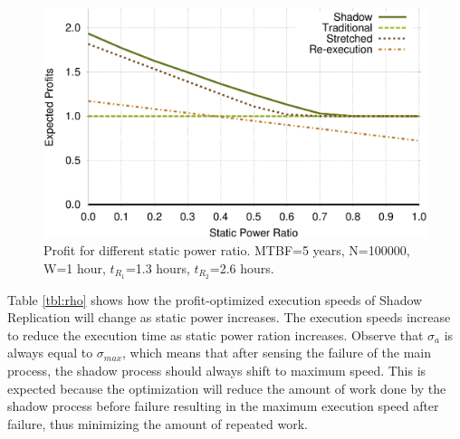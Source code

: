 \begin{figure}[!h]	
	\begin{center}
		\includegraphics[width=\columnwidth]{diagrams/rho_profit.eps}
	\end{center}
	\caption{Profit for different static power ratio. MTBF=5 years, N=100000, W=1 hour, $t_{R_1}$=1.3 hours, $t_{R_2}$=2.6 hours.}
	\label{fig:rho}
\end{figure}

Table \ref{tbl:rho} shows how the profit-optimized execution speeds
of Shadow Replication will change as static power increases. The execution speeds increase to reduce the execution time as static power ration increases. Observe
that $\sigma_a$ is always equal to $\sigma_{max}$, which means that after
sensing the failure of the main process, the shadow process should always
shift to maximum speed. This is expected because the optimization will
reduce the amount of work done by the shadow process before failure
resulting in the maximum execution speed after failure, thus
minimizing the amount of repeated work. %

